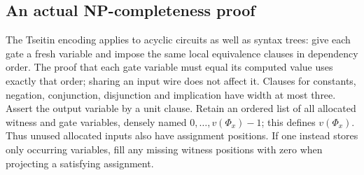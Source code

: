 \subsection{An actual NP-completeness proof}

The Tseitin encoding applies to acyclic circuits as well as syntax trees:
give each gate a fresh variable and impose the same local equivalence
clauses in dependency order. The proof that each gate variable must equal
its computed value uses exactly that order; sharing an input wire does
not affect it. Clauses for constants, negation, conjunction, disjunction
and implication have width at most three. Assert the output variable
by a unit clause. Retain an ordered list of all allocated witness and gate
variables, densely named $0,\ldots,v(\Phi_x)-1$; this defines
$v(\Phi_x)$. Thus unused allocated inputs also have assignment positions.
If one instead stores only occurring variables, fill any missing witness
positions with zero when projecting a satisfying assignment.


